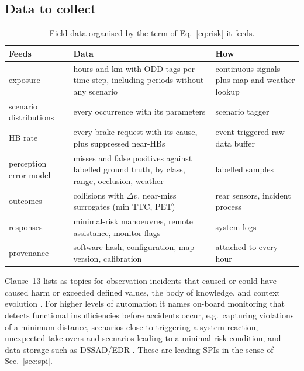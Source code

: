 \documentclass[11pt,a4paper]{article}
\begin{document}
\subsection{Data to collect}
\begin{table}[H]\centering\small
\caption{Field data organised by the term of Eq.~\eqref{eq:risk} it feeds.}
\begin{tabular}{L{2.8cm}L{7.4cm}L{4.2cm}}
\toprule
Feeds & Data & How\\\midrule
exposure & hours and km with ODD tags per time step, including periods without any scenario & continuous signals plus map and weather lookup\\
scenario distributions & every occurrence with its parameters & scenario tagger \cite[Sec.~III]{guo2023}\\
HB rate & every brake request with its cause, plus suppressed near-HBs & event-triggered raw-data buffer\\
perception error model & misses and false positives against labelled ground truth, by class, range, occlusion, weather & labelled samples\\
outcomes & collisions with $\Delta v$, near-miss surrogates (min TTC, PET) & rear sensors, incident process\\
responses & minimal-risk manoeuvres, remote assistance, monitor flags \cite[Sec.~4]{schaller2026} & system logs\\
provenance & software hash, configuration, map version, calibration & attached to every hour\\
\bottomrule
\end{tabular}
\end{table}
Clause~13 lists as topics for observation incidents that caused or could have caused harm or exceeded defined values, the body of knowledge, and context evolution \cite[13.3~a)--c), pp.~56--57]{iso21448}. For higher levels of automation it names on-board monitoring that detects functional insufficiencies before accidents occur, e.g.\ capturing violations of a minimum distance, scenarios close to triggering a system reaction, unexpected take-overs and scenarios leading to a minimal risk condition, and data storage such as DSSAD/EDR \cite[13.3, Note~1 and Examples~1--2, p.~56]{iso21448}. These are leading SPIs in the sense of Sec.~\ref{sec:spi}.
\end{document}
